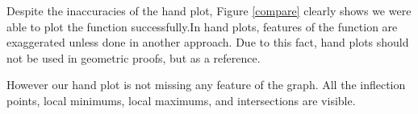 Despite the inaccuracies of the hand plot, Figure \ref{compare} clearly
shows we were able to plot the function successfully.In hand plots,
features of the function are exaggerated unless done in another
approach. Due to this fact, hand plots should not be used in geometric
proofs, but as a reference.

However our hand plot is not missing any feature of the graph. All the 
inflection points, local minimums, local maximums, and intersections are
visible.